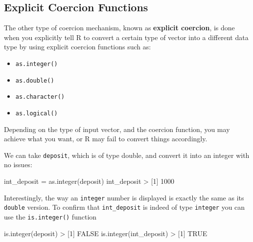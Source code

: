 \documentclass[
]{book}
\newenvironment{Shaded}{\begin{snugshade}}{\end{snugshade}}
\newcommand{\ConstantTok}[1]{\textcolor[rgb]{0.00,0.00,0.00}{#1}}
\newcommand{\DecValTok}[1]{\textcolor[rgb]{0.00,0.00,0.81}{#1}}
\newcommand{\FunctionTok}[1]{\textcolor[rgb]{0.00,0.00,0.00}{#1}}
\newcommand{\NormalTok}[1]{#1}
\newcommand{\OtherTok}[1]{\textcolor[rgb]{0.56,0.35,0.01}{#1}}
\newcommand{\SpecialCharTok}[1]{\textcolor[rgb]{0.00,0.00,0.00}{#1}}
\providecommand{\tightlist}{%
  \setlength{\itemsep}{0pt}\setlength{\parskip}{0pt}}
\begin{document}
\hypertarget{explicit-coercion-functions}{%
\subsection{Explicit Coercion Functions}\label{explicit-coercion-functions}}

The other type of coercion mechanism, known as \textbf{explicit coercion}, is done
when you explicitly tell R to convert a certain type of vector into a different
data type by using explicit coercion functions such as:

\begin{itemize}
\tightlist
\item
  \texttt{as.integer()}
\item
  \texttt{as.double()}
\item
  \texttt{as.character()}
\item
  \texttt{as.logical()}
\end{itemize}

Depending on the type of input vector, and the coercion function, you may
achieve what you want, or R may fail to convert things accordingly.

We can take \texttt{deposit}, which is of type double, and convert it into an integer
with no issues:

\begin{Shaded}
\begin{Highlighting}[]
\NormalTok{int\_deposit }\OtherTok{=} \FunctionTok{as.integer}\NormalTok{(deposit)}
\NormalTok{int\_deposit}
\SpecialCharTok{\textgreater{}}\NormalTok{ [}\DecValTok{1}\NormalTok{] }\DecValTok{1000}
\end{Highlighting}
\end{Shaded}

Interestingly, the way an \texttt{integer} number is displayed is exactly the same
as its \texttt{double} version. To confirm that \texttt{int\_deposit} is indeed of type
\texttt{integer} you can use the \texttt{is.integer()} function

\begin{Shaded}
\begin{Highlighting}[]
\FunctionTok{is.integer}\NormalTok{(deposit)}
\SpecialCharTok{\textgreater{}}\NormalTok{ [}\DecValTok{1}\NormalTok{] }\ConstantTok{FALSE}
\FunctionTok{is.integer}\NormalTok{(int\_deposit)}
\SpecialCharTok{\textgreater{}}\NormalTok{ [}\DecValTok{1}\NormalTok{] }\ConstantTok{TRUE}
\end{Highlighting}
\end{Shaded}
\end{document}
